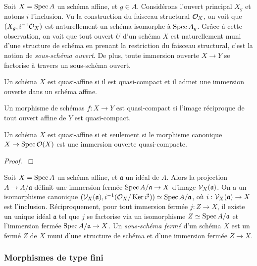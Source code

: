 Soit $X=\operatorname{Spec} A$ un schéma affine, et $g\in A$. Considérons l'ouvert principal $X_g$ et notons $i$ l'inclusion. Vu la construction du faisceau structural $\mathcal{O}_X$, on voit que $(X_g, i^{-1}\mathcal{O}_X)$ est naturellement un schéma isomorphe à $\operatorname{Spec} A_g$. Grâce à cette observation, on voit que tout ouvert $U$ d'un schéma $X$ est naturellement muni d'une structure de schéma en prenant la restriction du faisceau structural, c'est la notion de \textit{sous-schéma ouvert}. De plus, toute immersion ouverte $X\rightarrow Y$ se factorise à travers un sous-schéma ouvert.

\begin{defn}
Un schéma $X$ est quasi-affine si il est quasi-compact et il admet une immersion ouverte dans un schéma affine.
\end{defn}

\begin{defn}
Un morphisme de schémas $f:X\rightarrow Y$ est quasi-compact si l'image réciproque de tout ouvert affine de $Y$ est quasi-compact. 
\end{defn}

\begin{prop}\label{QuasiAffCritere}
Un schéma $X$ est quasi-affine si et seulement si le morphisme canonique $X\rightarrow \operatorname{Spec} \mathcal{O}(X)$ est une immersion ouverte quasi-compacte.
\end{prop}
\begin{proof}
\cite[II.5.1.2]{EGA}
\end{proof}


Soit $X=\operatorname{Spec} A$ un schéma affine, et $\mathfrak{a}$ un idéal de $A$. Alors la projection $A\rightarrow A/\mathfrak{a}$ définit une immersion fermée $\operatorname{Spec} A/\mathfrak{a}\rightarrow X$ d'image $\mathcal{V}_X(\mathfrak{a})$. On a un isomorphisme canonique $(\mathcal{V}_X(\mathfrak{a}), i^{-1}(\mathcal{O}_X/\operatorname{Ker} i^\sharp))\simeq \operatorname{Spec} A/\mathfrak{a}$, où $i:\mathcal{V}_X(\mathfrak{a})\rightarrow X$ est l'inclusion. Réciproquement, pour tout immersion fermée $j:Z\rightarrow X$, il existe un unique idéal $\mathfrak{a}$ tel que $j$ se factorise via un isomorphisme $Z\simeq \operatorname{Spec} A/\mathfrak{a}$ et l'immersion fermée $\operatorname{Spec} A/\mathfrak{a}\rightarrow X$. Un \textit{sous-schéma fermé} d'un schéma $X$ est un fermé $Z$ de $X$ muni d'une structure de schéma et d'une immersion fermée $Z\rightarrow X$. 

\subsubsection{Morphismes de type fini}

